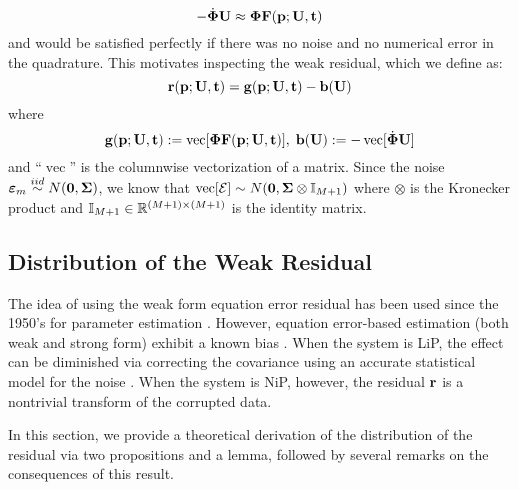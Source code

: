 \begin{equation}
	\label{eq:weakSys}
	-\dot{\boldsymbol{\Phi}} \mathbf{U} \approx \boldsymbol{\Phi} \mathbf{F}(\mathbf{p};\mathbf{U},\mathbf{t})
\end{equation}
and would be satisfied perfectly if there was no noise and no numerical error in the quadrature. This motivates inspecting the weak residual, which we define as: 
\begin{equation}
	\label{eq:weakRes}
	\mathbf{r}(\mathbf{p}; \mathbf{U}, \mathbf{t}) = \mathbf{g}(\mathbf{p};\mathbf{U},\mathbf{t}) - \mathbf{b}(\mathbf{U})
\end{equation}
where 
\[
\mathbf{g}(\mathbf{p};\mathbf{U},\mathbf{t}) := \operatorname{vec}[ \boldsymbol{\Phi} \mathbf{F}(\mathbf{p};\mathbf{U}, \mathbf{t})], \;
\mathbf{b}(\mathbf{U}) := - \operatorname{vec}[\dot{\boldsymbol{\Phi}} \mathbf{U}]
\]
and ``$\operatorname{vec}$'' is the columnwise vectorization of a matrix. Since the noise $\boldsymbol{\varepsilon}_m \stackrel{iid}{\sim} N({\mathbf{0}},{\mathbf{\Sigma}})$, we know that  $\operatorname{vec}[\mathbf{\mathcal{E}}] \sim N({\mathbf{0}},  \mathbf{\Sigma} \otimes \mathbb{I}_{M+1})$ where $\otimes$ is the Kronecker product and $\mathbb{I}_{M+1}\in \mathbb{R}^{(M+1)\times (M+1)}$ is the identity matrix. 

\subsection{Distribution of the Weak Residual}

The idea of using the weak form equation error residual has been used since the 1950's for parameter estimation \citep{Shinbrot1954NACATN3288}. However, equation error-based estimation (both weak and strong form) exhibit a known bias \citep{Regalia1994IEEETransSignalProcess}. When the system is LiP, the effect can be diminished via correcting the covariance using an accurate statistical model for the noise \citep{BortzMessengerDukic2023BullMathBiol}. When the system is NiP, however, the residual $\mathbf{r}$ is a nontrivial transform of the corrupted data.

In this section, we provide a theoretical derivation of the distribution of the residual via two propositions and a lemma, followed by several remarks on the consequences of this result.

